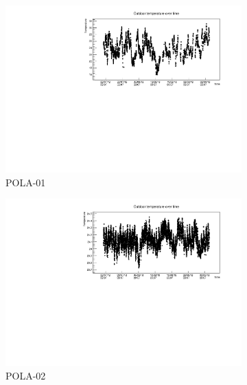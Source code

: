 \documentclass[12pt,a4paper]{amsart}
\begin{document}
\begin{figure}
\centering
	\begin{subfigure}[b]{\textwidth}
	\centering
		\includegraphics[width=\textwidth]{../data/plots/POLA-01/OutdoorTemp_POLA-01.pdf}
		\caption{POLA-01}
		\label{fig:outdoortemp_POLA-01}
	\end{subfigure}
	\begin{subfigure}[b]{0.6\textwidth}
	\centering
		\includegraphics[width=\textwidth]{../data/plots/POLA-02/OutdoorTemp_POLA-02.pdf}
		\caption{POLA-02}
		\label{fig:outdoortemp_POLA-02}
	\end{subfigure}%
	\begin{subfigure}[b]{0.6\textwidth}
	\centering

\end{subfigure}
\end{figure}
\end{document}
